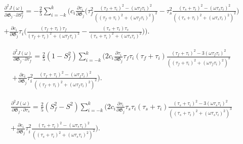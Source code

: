 \documentclass[a4paper,11pt,twoside,openright]{book}
\def\lthtmlcheckvsize{\ifdim\ht\sizebox<\vsize 
  \ifdim\wd\sizebox<\hsize\expandafter\hfill\fi \expandafter\vfill
  \else\expandafter\vss\fi}%
\begin{document}
{\newpage\clearpage
{}%
\begin{multline}
    \frac{\partial^2 J(\omega)}{\partial \mathfrak{G}_j \cdot \partial S^2_f} = -\frac{2}{5} \sum_{i=-k}^k \Bigg(
        c_i \frac{\partial \tau_i}{\partial \mathfrak{G}_j} \Bigg(
            \tau_f^2 \frac{(\tau_f + \tau_i)^2 - (\omega \tau_f \tau_i)^2}{\left((\tau_f + \tau_i)^2 + (\omega \tau_f \tau_i)^2 \right)^2}
            - \tau_s^2 \frac{(\tau_s + \tau_i)^2 - (\omega \tau_s \tau_i)^2}{\left((\tau_s + \tau_i)^2 + (\omega \tau_s \tau_i)^2 \right)^2}
        \Bigg) \\
        +  \frac{\partial c_i}{\partial \mathfrak{G}_j} \tau_i \Bigg(
            \frac{(\tau_f + \tau_i)\tau_f}{(\tau_f + \tau_i)^2 + (\omega \tau_f \tau_i)^2}
            - \frac{(\tau_s + \tau_i)\tau_s}{(\tau_s + \tau_i)^2 + (\omega \tau_s \tau_i)^2}
        \Bigg)
    \Bigg).
\end{multline}%
\lthtmldisplayZ
\lthtmlcheckvsize\clearpage}

{\newpage\clearpage
{}%
\begin{multline}
    \frac{\partial^2 J(\omega)}{\partial \mathfrak{G}_j \cdot \partial \tau_f} = \frac{2}{5} (1 - S^2_f) \sum_{i=-k}^k \Bigg(
        2 c_i \frac{\partial \tau_i}{\partial \mathfrak{G}_j} \tau_f \tau_i (\tau_f + \tau_i)
            \frac{(\tau_f + \tau_i)^2 - 3(\omega \tau_f \tau_i)^2}{\left((\tau_f + \tau_i)^2 + (\omega \tau_f \tau_i)^2 \right)^3}  \\
        + \frac{\partial c_i}{\partial \mathfrak{G}_j} \tau_i^2 \frac{(\tau_f + \tau_i)^2 - (\omega \tau_f \tau_i)^2}{\left((\tau_f + \tau_i)^2 + (\omega \tau_f \tau_i)^2 \right)^2}
    \Bigg).
\end{multline}%
\lthtmldisplayZ
\lthtmlcheckvsize\clearpage}

{\newpage\clearpage
{}%
\begin{multline}
    \frac{\partial^2 J(\omega)}{\partial \mathfrak{G}_j \cdot \partial \tau_s} = \frac{2}{5} (S^2_f - S^2) \sum_{i=-k}^k \Bigg(
        2 c_i \frac{\partial \tau_i}{\partial \mathfrak{G}_j} \tau_s \tau_i (\tau_s + \tau_i)
            \frac{(\tau_s + \tau_i)^2 - 3(\omega \tau_s \tau_i)^2}{\left((\tau_s + \tau_i)^2 + (\omega \tau_s \tau_i)^2 \right)^3}  \\
        + \frac{\partial c_i}{\partial \mathfrak{G}_j} \tau_i^2 \frac{(\tau_s + \tau_i)^2 - (\omega \tau_s \tau_i)^2}{\left((\tau_s + \tau_i)^2 + (\omega \tau_s \tau_i)^2 \right)^2}
    \Bigg).
\end{multline}%
\lthtmldisplayZ
\lthtmlcheckvsize\clearpage}
\end{document}
